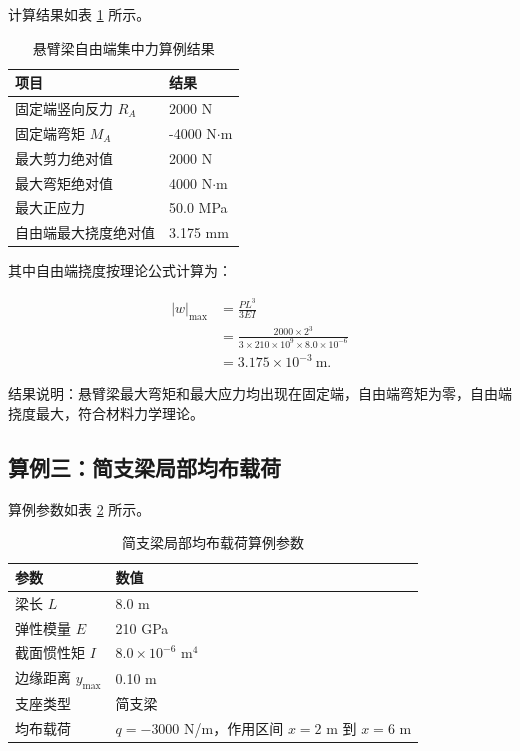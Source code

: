 \documentclass[UTF8,a4paper,12pt]{ctexart}
\numberwithin{equation}{section}
\begin{document}
计算结果如表 \ref{tab:cantilever-result} 所示。

\begin{table}[H]
\centering
\caption{悬臂梁自由端集中力算例结果}
\label{tab:cantilever-result}
\begin{tabular}{ll}
\toprule
项目 & 结果 \\
\midrule
固定端竖向反力 $R_A$ & 2000 N \\
固定端弯矩 $M_A$ & -4000 N$\cdot$m \\
最大剪力绝对值 & 2000 N \\
最大弯矩绝对值 & 4000 N$\cdot$m \\
最大正应力 & 50.0 MPa \\
自由端最大挠度绝对值 & 3.175 mm \\
\bottomrule
\end{tabular}
\end{table}

其中自由端挠度按理论公式计算为：

\begin{align}
|w|_{\max}
&=\frac{PL^3}{3EI}\\
&=\frac{2000\times2^3}{3\times210\times10^9\times8.0\times10^{-6}}\\
&=3.175\times10^{-3}\ \text{m}.
\end{align}

结果说明：悬臂梁最大弯矩和最大应力均出现在固定端，自由端弯矩为零，自由端挠度最大，符合材料力学理论。

\subsection{算例三：简支梁局部均布载荷}

算例参数如表 \ref{tab:udl-param} 所示。

\begin{table}[H]
\centering
\caption{简支梁局部均布载荷算例参数}
\label{tab:udl-param}
\begin{tabular}{ll}
\toprule
参数 & 数值 \\
\midrule
梁长 $L$ & 8.0 m \\
弹性模量 $E$ & 210 GPa \\
截面惯性矩 $I$ & $8.0\times10^{-6}$ m$^4$ \\
边缘距离 $y_{\max}$ & 0.10 m \\
支座类型 & 简支梁 \\
均布载荷 & $q=-3000$ N/m，作用区间 $x=2$ m 到 $x=6$ m \\
\bottomrule
\end{tabular}
\end{table}
\end{document}
